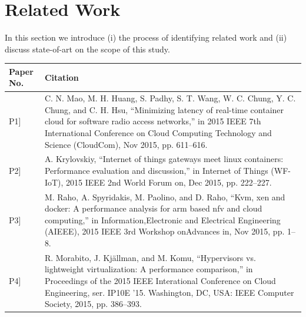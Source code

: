 \chapter{Related Work} \label{section:relatedwork} 
In this section we introduce (i) the process of identifying related work and (ii) discuss state-of-art on the scope of this study. 

\begin{table}[ht]
\renewcommand{\arraystretch}{1.4}
\begin{tabular}{| >{\centering}m{1.3cm} |>{\arraybackslash}m{12.7cm}|}
\hline
\textbf{Paper No.} & \textbf{Citation}\\ \hline
{[}P1{]}  & C. N. Mao, M. H. Huang, S. Padhy, S. T. Wang, W. C. Chung, Y. C. Chung, and C. H. Hsu, “Minimizing latency of real-time container cloud for software radio access networks,” in 2015 IEEE 7th International Conference on Cloud Computing Technology and Science (CloudCom), Nov 2015, pp. 611–616.                                  \\
{[}P2{]}  & A. Krylovskiy, “Internet of things gateways meet linux containers: Performance evaluation and discussion,” in Internet of Things (WF-IoT), 2015 IEEE 2nd World Forum on, Dec 2015, pp. 222–227.                                                                                                                                      \\
{[}P3{]}  & M. Raho, A. Spyridakis, M. Paolino, and D. Raho, “Kvm, xen and docker: A performance analysis for arm based nfv and cloud computing,” in Information,Electronic and Electrical Engineering (AIEEE), 2015 IEEE 3rd Workshop onAdvances in, Nov 2015, pp. 1–8.                                                                         \\
{[}P4{]}  & R. Morabito, J. Kj\"allman, and M. Komu, “Hypervisors vs. lightweight virtualization: A performance comparison,” in Proceedings of the 2015 IEEE Interational Conference on Cloud Engineering, ser. IP10E ’15. Washington, DC, USA: IEEE Computer Society, 2015, pp. 386–393.                                                      \\

\end{tabular}
\end{table}
